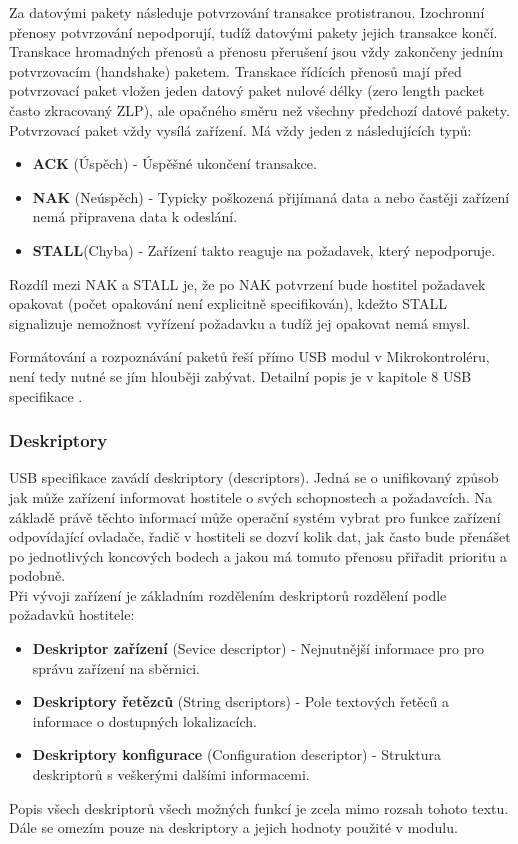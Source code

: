 Za datovými pakety následuje potvrzování transakce protistranou. Izochronní přenosy potvrzování nepodporují, tudíž datovými pakety jejich transakce končí. Transkace hromadných přenosů a přenosu přerušení jsou vždy zakončeny jedním potvrzovacím (handshake) paketem.  Transkace řídících přenosů mají před potvrzovací paket vložen jeden datový paket nulové délky (zero length packet často zkracovaný ZLP), ale opačného směru než všechny předchozí datové pakety. Potvrzovací paket vždy vysílá zařízení. Má vždy jeden z následujících typů:
\begin{itemize}
\item \textbf{ACK} (Úspěch) - Úspěšné ukončení transakce.
\item \textbf{NAK} (Neúspěch) - Typicky poškozená přijímaná data a nebo častěji zařízení nemá připravena data k odeslání.
\item \textbf{STALL}(Chyba) - Zařízení takto reaguje na požadavek, který nepodporuje.
\end{itemize}
Rozdíl mezi NAK a STALL je, že po NAK potvrzení bude hostitel požadavek opakovat (počet opakování není explicitně specifikován), kdežto STALL signalizuje nemožnost vyřízení požadavku a tudíž jej opakovat nemá smysl.

Formátování a rozpoznávání paketů řeší přímo USB modul v Mikrokontroléru, není tedy nutné se jím hlouběji zabývat. Detailní popis je v kapitole 8 USB specifikace \cite{usb-spec}.


\subsubsection{Deskriptory}
USB specifikace zavádí deskriptory (descriptors). Jedná se o unifikovaný způsob jak může zařízení informovat hostitele o svých schopnostech a požadavcích. Na základě právě těchto informací může operační systém vybrat pro funkce zařízení odpovídající ovladače, řadič v hostiteli se dozví kolik dat, jak často bude přenášet po jednotlivých koncových bodech a jakou má tomuto přenosu přiřadit prioritu a podobně.\\
Při vývoji zařízení je základním rozdělením deskriptorů rozdělení podle požadavků hostitele:
\begin{itemize}
\item \textbf{Deskriptor zařízení} (Sevice descriptor) - Nejnutnější informace pro pro správu zařízení na sběrnici.
\item \textbf{Deskriptory řetězců} (String dscriptors) - Pole textových řetěců a informace o dostupných lokalizacích.
\item \textbf{Deskriptory konfigurace} (Configuration descriptor) - Struktura deskriptorů s veškerými dalšími informacemi.
\end{itemize}
Popis všech deskriptorů všech možných funkcí je zcela mimo rozsah tohoto textu. Dále se omezím pouze na deskriptory a jejich hodnoty použité v modulu.


